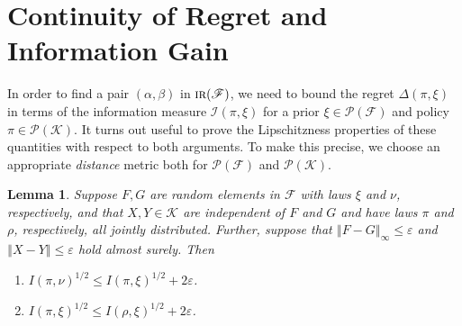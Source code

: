\documentclass[letter, 12pt]{report}
\newcommand{\norm}[1]{\left \Vert  #1 \right \Vert}
\newcommand{\cK}{\mathcal K}
\newcommand{\sF}{\mathscr F}
\newcommand{\cI}{\mathcal I}
\newcommand{\sP}{\mathscr P}
\newcommand{\1}{\mathbf{1}}
\newcommand{\IR}{\operatorname{\textsc{ir}}}
\renewcommand{\epsilon}{\varepsilon}
\theoremstyle{plain}
\newtheorem{lemma}[theorem]{Lemma}
\theoremstyle{definition}
\theoremstyle{remark}
\begin{document}
\section{Continuity of Regret and Information Gain}
In order to find a pair $(\alpha, \beta)$ in $\IR(\sF)$, we need to bound the regret $\Delta(\pi, \xi)$ in terms of the information measure $\cI(\pi, \xi)$ for a prior $\xi \in \sP(\sF)$ and policy $\pi \in \sP(\cK)$.
It turns out useful to prove the Lipschitzness properties of these quantities with respect to both arguments.
To make this precise, we choose an appropriate \textit{distance} metric both for $\sP(\sF)$ and $\sP(\cK)$.
\begin{lemma}\label{lem:cont:I}
    Suppose $F, G$ are random elements in $\sF$ with laws $\xi$ and $\nu$, respectively,
    and that $X, Y \in \cK$ are independent of $F$ and $G$ and have laws $\pi$ and $\rho$, respectively, all jointly distributed.
    Further, suppose that
    $\norm{F - G}_\infty \leq \epsilon$ and $\norm{X - Y} \leq \epsilon$ hold almost surely.
    Then
    \begin{enumerate}
        \item $I(\pi, \nu)^{1/2} \leq I(\pi, \xi)^{1/2} + 2\epsilon$.
        \item $I(\pi, \xi)^{1/2} \leq I(\rho, \xi)^{1/2} + 2\epsilon$.
    \end{enumerate}
\end{lemma}
\end{document}
